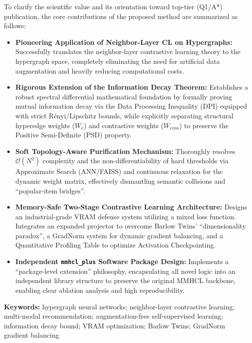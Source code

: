     \begin{tcolorbox}[contribstyle]
    \small
    To clarify the scientific value and its orientation toward top-tier (Q1/A*) publication, the core contributions of the proposed method are summarized as follows:
    \begin{itemize}[leftmargin=1.2em, itemsep=0.45em]
        \item \textbf{Pioneering Application of Neighbor-Layer CL on Hypergraphs:} Successfully translates the neighbor-layer contrastive learning theory to the hypergraph space, completely eliminating the need for artificial data augmentation and heavily reducing computational costs.
        \item \textbf{Rigorous Extension of the Information Decay Theorem:} Establishes a robust spectral differential mathematical foundation by formally proving mutual information decay via the Data Processing Inequality (DPI) equipped with strict R\'enyi/Lipschitz bounds, while explicitly separating structural hyperedge weights ($W_e$) and contrastive weights ($W_{ema}$) to preserve the Positive Semi-Definite (PSD) property.
        \item \textbf{Soft Topology-Aware Purification Mechanism:} Thoroughly resolves $\mathcal{O}(N^2)$ complexity and the non-differentiability of hard thresholds via Approximate Search (ANN/FAISS) and continuous relaxation for the dynamic weight matrix, effectively dismantling semantic collisions and ``popular-item bridges''.
        \item \textbf{Memory-Safe Two-Stage Contrastive Learning Architecture:} Designs an industrial-grade VRAM defense system utilizing a mixed loss function. Integrates an expanded projector to overcome Barlow Twins' ``dimensionality paradox'', a GradNorm system for dynamic gradient balancing, and a Quantitative Profiling Table to optimize Activation Checkpointing.
        \item \textbf{Independent \texttt{mmhcl\_plus} Software Package Design:} Implements a ``package-level extension'' philosophy, encapsulating all novel logic into an independent library structure to preserve the original MMHCL backbone, enabling clear ablation analysis and high reproducibility.
    \end{itemize}
    \end{tcolorbox}
    
    \begin{tcolorbox}[
      enhanced,
      colback   = accentblue!2,
      colframe  = accentblue!30,
      arc       = 2pt,
      boxrule   = 0.6pt,
      left      = 12pt, right = 12pt,
      top       = 5pt,  bottom = 5pt,
      before skip = 4pt, after skip = 10pt,
    ]
    \noindent\textbf{\sffamily\small\color{accentblue} Keywords:}\enspace\small
    hypergraph neural networks;\enspace
    neighbor-layer contrastive learning;\enspace
    multi-modal recommendation;\enspace
    augmentation-free self-supervised learning;\enspace
    information decay bound;\enspace
    VRAM optimization;\enspace
    Barlow Twins;\enspace
    GradNorm gradient balancing
    \end{tcolorbox}
    
